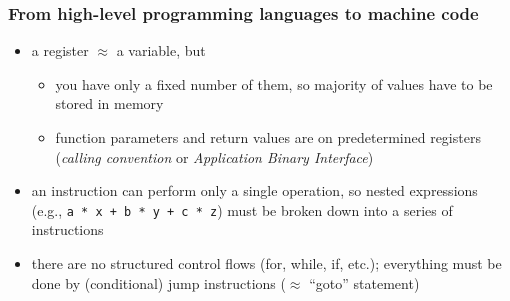 \documentclass[12pt,dvipdfmx]{beamer}
\newif\ifen
\newif\ifja
\begin{document}
\ifja
\section{コンパイルの基本}
\fi
\ifen
\section{Compilation Basics}
\fi

\begin{frame}
  \frametitle{From high-level programming languages to machine code}
  \begin{itemize}
  \item a register $\approx$ a variable, but
    \begin{itemize}
    \item you have only a fixed number of them,
      so majority of values have to be stored in memory
    \item function parameters and return values are on
      predetermined registers ({\it calling convention}
      or {\it Application Binary Interface})
    \end{itemize}
  \item an instruction can perform only a single operation, so
    nested expressions (e.g., {\tt a * x + b * y + c * z}) must be
    broken down into a series of instructions
  \item there are no structured control flows (for, while, if, etc.);
    everything must be done by (conditional) jump instructions
    ($\approx$ ``goto'' statement)
  \end{itemize}
\end{frame}

\ifja
\begin{frame}[fragile]
  \frametitle{コード生成 --- 人間コンパイラ内観}
  \begin{itemize}
  \item 例: 以下(ちなみに$\sqrt{c}$を求めるニュートン法)をどう機械語にするか
\begin{lstlisting}
double sq(double c, long n) {
  double x = c;
  for (long i = 0; i < n; i++) {
    x = x / 2 + c / (x + x);
  }
  return x;
}
\end{lstlisting}
\end{itemize}
\end{frame}
\fi

\ifen
\begin{frame}[fragile]
  \frametitle{Code generation by hand --- introspecting ``human compiler''}
  \begin{itemize}
  \item ex: how to convert the following (which finds $\sqrt{c}$ by the Newton method)
    into machine language 
\begin{lstlisting}
double sq(double c, long n) {
  double x = c;
  for (long i = 0; i < n; i++) {
    x = x / 2 + c / (x + x);
  }
  return x;
}
\end{lstlisting}
\end{itemize}
\end{frame}
\fi
\end{document}
